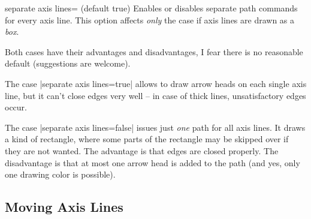 \begin{pgfplotskey}{separate axis lines= (default true)}
    Enables or disables separate path commands for every axis line. This option
    affects \emph{only} the case if axis lines are drawn as a \emph{box}.

    Both cases have their advantages and disadvantages, I fear there is no
    reasonable default (suggestions are welcome).

    The case |separate axis lines=true| allows to draw arrow heads on each
    single axis line, but it can't close edges very well -- in case of thick
    lines, unsatisfactory edges occur.
\begin{codeexample}[]
\end{codeexample}

    The case |separate axis lines=false| issues just \emph{one} path for all
    axis lines. It draws a kind of rectangle, where some parts of the rectangle
    may be skipped over if they are not wanted. The advantage is that edges are
    closed properly. The disadvantage is that at most one arrow head is added
    to the path (and yes, only one drawing color is possible).
\begin{codeexample}[]
\end{codeexample}
\end{pgfplotskey}


\subsection{Moving Axis Lines}

